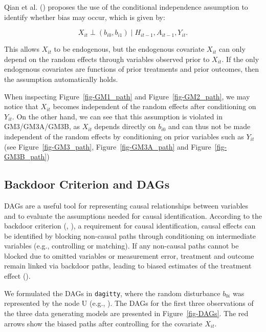 \documentclass[
  12pt,
  a4paper,
]{article}
\begin{document}
Qian et al. () proposes the use of the
conditional independence assumption to identify whether bias may occur,
which is given by:

\[ X_{it} \perp (b_{i0}, b_{i1}) \mid H_{it-1}, A_{it-1}, Y_{it}. \]

This allows \(X_{it}\) to be endogenous, but the endogenous covariate
\(X_{it}\) can only depend on the random effects through variables
observed prior to \(X_{it}\). If the only endogenous covariates are
functions of prior treatments and prior outcomes, then the assumption
automatically holds.

When inspecting Figure~\ref{fig-GM1_path} and Figure~\ref{fig-GM2_path},
we may notice that \(X_{it}\) becomes independent of the random effects
after conditioning on \(Y_{it}\). On the other hand, we can see that
this assumption is violated in GM3/GM3A/GM3B, as \(X_{it}\) depends
directly on \(b_{i0}\) and can thus not be made independent of the
random effects by conditioning on prior variables such as \(Y_{it}\)
(see Figure~\ref{fig-GM3_path}, Figure~\ref{fig-GM3A_path} and
Figure~\ref{fig-GM3B_path})

\subsection{Backdoor Criterion and
DAGs}\label{backdoor-criterion-and-dags}

DAGs are a useful tool for representing causal relationships between
variables and to evaluate the assumptions needed for causal
identification. According to the backdoor criterion
(, ),
a requirement for causal identification, causal effects can be
identified by blocking non-causal paths through conditioning on
intermediate variables (e.g., controlling or matching). If any
non-causal paths cannot be blocked due to omitted variables or
measurement error, treatment and outcome remain linked via backdoor
paths, leading to biased estimates of the treatment effect
().

We formulated the DAGs in \texttt{dagitty}, where the random disturbance
\(b_{0i}\) was represented by the node U (e.g.,
). The DAGs for the first
three observations of the three data generating models are presented in
Figure~\ref{fig-DAGs}. The red arrows show the biased paths after
controlling for the covariate \(X_{it}\).
\end{document}
